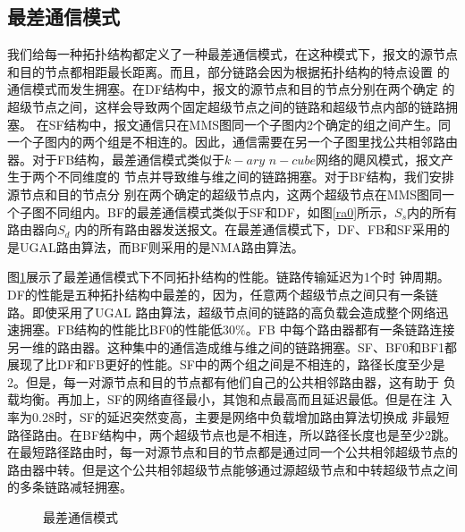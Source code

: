   \subsection{最差通信模式}

  我们给每一种拓扑结构都定义了一种最差通信模式，在这种模式下，报文的源节点和目的节点都相距最长距离。而且，部分链路会因为根据拓扑结构的特点设置
  的通信模式而发生拥塞。在DF结构中，报文的源节点和目的节点分别在两个确定
  的超级节点之间，这样会导致两个固定超级节点之间的链路和超级节点内部的链路拥塞。 在SF结构中，报文通信只在MMS图同一个子图内2个确定的组之间产生。同一个子图内的两个组是不相连的。因此，通信需要在另一个子图里找公共相邻路由器。对于FB结构，最差通信模式类似于$k-ary$ $n-cube$网络的飓风模式，报文产生于两个不同维度的
  节点并导致维与维之间的链路拥塞。对于BF结构，我们安排源节点和目的节点分
  别在两个确定的超级节点内，这两个超级节点在MMS图同一个子图不同组内。BF的最差通信模式类似于SF和DF，如图\ref{ra0}所示，$S_s$内的所有路由器向$S_d$ 内的所有路由器发送报文。在最差通信模式下，DF、FB和SF采用的是UGAL路由算法，而BF则采用的是NMA路由算法。

  图\ref{adv}展示了最差通信模式下不同拓扑结构的性能。链路传输延迟为1个时
  钟周期。DF的性能是五种拓扑结构中最差的，因为，任意两个超级节点之间只有一条链路。即使采用了UGAL 路由算法，超级节点间的链路的高负载会造成整个网络迅速拥塞。FB结构的性能比BF0的性能低$30\%$。FB 中每个路由器都有一条链路连接另一维的路由器。这种集中的通信造成维与维之间的链路拥塞。SF、BF0和BF1都展现了比DF和FB更好的性能。SF中的两个组之间是不相连的，路径长度至少是2。但是，每一对源节点和目的节点都有他们自己的公共相邻路由器，这有助于
  负载均衡。再加上，SF的网络直径最小，其饱和点最高而且延迟最低。但是在注
  入率为0.28时，SF的延迟突然变高，主要是网络中负载增加路由算法切换成
  非最短路径路由。在BF结构中，两个超级节点也是不相连，所以路径长度也是至少2跳。在最短路径路由时，每一对源节点和目的节点都是通过同一个公共相邻超级节点的路由器中转。但是这个公共相邻超级节点能够通过源超级节点和中转超级节点之间的多条链路减轻拥塞。

  \begin{figure}[t]
\setlength{\belowcaptionskip}{-.5cm}%
  \centering
 \begin{minipage}[t]{\textwidth}
   \centering
  \vspace{-.3cm}
\caption{最差通信模式}
  \label{adv}
   \end{minipage}
    \end{figure}

